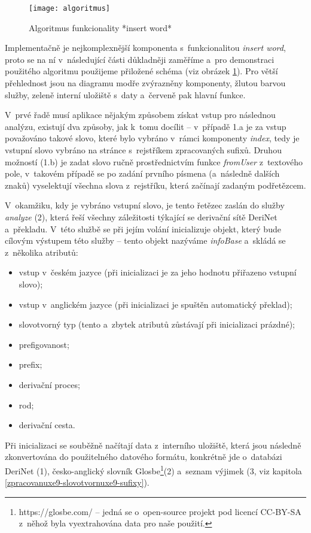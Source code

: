 \begin{figure}[ht]   
    \centering
    \texttt{[image: algoritmus]}  
    \caption{Algoritmus funkcionality *insert word*}
    \label{algoritmus}
 \end{figure}

Implementačně je nejkomplexnější komponenta s~funkcionalitou
\emph{insert word}, proto se na ní v~následující části důkladněji
zaměříme a~pro demonstraci použitého algoritmu použijeme přiložené
schéma (viz obrázek \ref{algoritmus}). Pro větší přehlednost jsou na
diagramu modře zvýrazněny komponenty, žlutou barvou služby, zeleně
interní uložiště s~daty a~červeně pak hlavní funkce.

V~prvé řadě musí aplikace nějakým způsobem získat vstup pro následnou
analýzu, existují dva způsoby, jak k~tomu docílit -- v~případě 1.a je za
vstup považováno takové slovo, které bylo vybráno v~rámci komponenty
\emph{index}, tedy je vstupní slovo vybráno na stránce s~rejstříkem
zpracovaných sufixů. Druhou možností (1.b) je zadat slovo ručně
prostřednictvím funkce \emph{fromUser} z~textového pole, v~takovém
případě se po zadání prvního písmena (a~následně dalších znaků)
vyselektují všechna slova z~rejstříku, která začínají zadaným
podřetězcem.

V~okamžiku, kdy je vybráno vstupní slovo, je tento řetězec zaslán do
služby \emph{analyze} (2), která řeší všechny záležitosti týkající se
derivační sítě DeriNet a~překladu. V~této službě se při jejím volání
inicializuje objekt, který bude cílovým výstupem této služby -- tento
objekt nazýváme \emph{infoBase} a~skládá se z~několika atributů:

\begin{itemize}
\tightlist
\item
  vstup v~českém jazyce (při inicializaci je za jeho hodnotu přiřazeno
  vstupní slovo);
\item
  vstup v~anglickém jazyce (při inicializaci je spuštěn automatický
  překlad);
\item
  slovotvorný typ (tento a~zbytek atributů zůstávají při inicializaci
  prázdné);
\item
  prefigovanost;
\item
  prefix;
\item
  derivační proces;
\item
  rod;
\item
  derivační cesta.
\end{itemize}

Při inicializaci se souběžně načítají data z~interního uložiště, která
jsou následně zkonvertována do použitelného datového formátu, konkrétně
jde o~databázi DeriNet (1), česko-anglický slovník
Glosbe\footnote{https://glosbe.com/ -- jedná se o~open-source projekt pod licencí CC-BY-SA z~něhož byla vyextrahována data pro naše použití.}(2)
a~seznam výjimek (3, viz kapitola
\ref{zpracovanuxe9-slovotvornuxe9-sufixy}).


